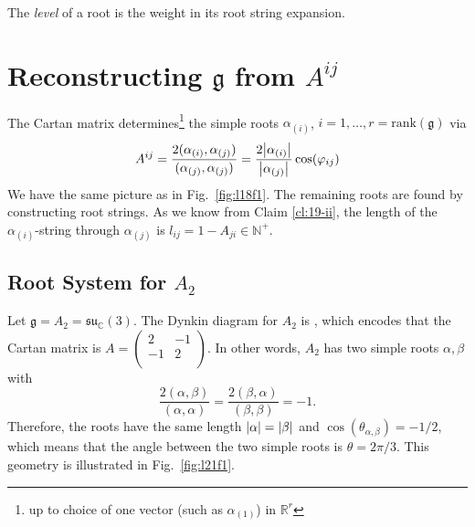 
\begin{definition}[level]
  The \emph{level} of a root is the weight in its root string expansion.
\end{definition}

\section{Reconstructing \texorpdfstring{$\mathfrak{g}$}{the Lie Algebra} from \texorpdfstring{$A^{ij}$}{the Cartan Matrix}}%
\label{sec:reconstructing_the_lie_algebra_from_the_cartan_matrix}

The Cartan matrix determines\footnote{up to choice of one vector (such as $\alpha_{(1)}$) in $\mathbb{R}^r$} the simple roots $\alpha_{(i)}$,  $i = 1, \dots, r = \text{rank}(\mathfrak{g})$ via
\begin{equation}
  A^{ij} = \frac{2(\alpha_{(i)}, \alpha_{(j)})}{(\alpha_{(j)}, \alpha_{(j)})} = \frac{2 \abs{\alpha_{(i)}}}{\abs{\alpha_{(j)}}} \cos(\varphi_{ij})
\end{equation}
We have the same picture as in Fig.~\ref{fig:l18f1}.
The remaining roots are found by constructing root strings. As we know from Claim \ref{cl:19-ii}, the length of the $\alpha_{(i)}$-string through $\alpha_{(j)}$ is $ l_{ij} = 1 - A_{ji} \in \mathbb{N}^+$.

\subsection{Root System for \texorpdfstring{$A_2$}{A2}}%
\label{sub:root_system_for_A2}

Let $\mathfrak{g} = A_2 = \mathfrak{su}_{\mathbb{C}}(3)$. The Dynkin diagram for $A_2$ is , which encodes that the Cartan matrix is $A = 
\begin{pmatrix}
 2 & -1 \\
 -1 & 2 \\
\end{pmatrix} $. In other words, $A_2$ has two simple roots $\alpha, \beta$ with
 \begin{equation}
   \frac{2(\alpha, \beta)}{(\alpha, \alpha)} = \frac{2(\beta, \alpha)}{(\beta, \beta)} = -1.
\end{equation}
Therefore, the roots have the same length $\abs{\alpha} = \abs{\beta}$ and $\cos(\theta_{\alpha, \beta}) = -{1} / {2}$, which means that the angle between the two simple roots is $\theta = {2\pi}/ {3}$. This geometry is illustrated in Fig.~\ref{fig:l21f1}.

